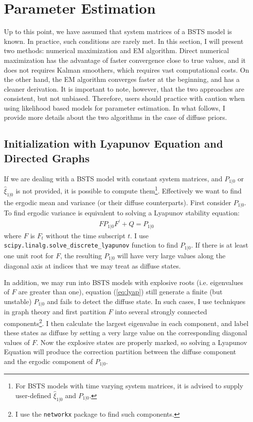 \documentclass[10pt, titlepage]{article}
\numberwithin{equation}{section}
\begin{document}
\section{Parameter Estimation} \label{sec:param}
Up to this point, we have assumed that system matrices of a BSTS model is known. In practice, such conditions are rarely met. In this section, I will present two methods: numerical maximization and EM algorithm. Direct numerical maximization has the advantage of faster convergence close to true values, and it does not requires Kalman smoothers, which requires vast computational costs. On the other hand, the EM algorithm converges faster at the beginning, and has a cleaner derivation. It is important to note, however, that the two approaches are consistent, but not unbiased. Therefore, users should practice with caution when using likelihood based models for parameter estimation. In what follows, I provide more details about the two algorithms in the case of diffuse priors.

\subsection{Initialization with Lyapunov Equation and Directed Graphs} 
If we are dealing with a BSTS model with constant system matrices, and $P_{1|0}$ or $\hat{\xi}_{1|0}$ is not provided, it is possible to compute them\footnote{For BSTS models with time varying system matrices, it is advised to supply user-defined $\hat{\xi}_{1|0}$ and $P_{1|0}$.}. Effectively we want to find the ergodic mean and variance (or their diffuse counterparts). First consider $P_{1|0}$. To find ergodic variance is equivalent to solving a Lyapunov stability equation:
\begin{align}
    FP_{1|0}F^{'} + Q = P_{1|0} \label{eq:lyap}
\end{align}
where $F$ is $F_t$ without the time subscript $t$. I use \texttt{scipy.linalg.solve\_discrete\_lyapunov} function to find $P_{1|0}$. If there is at least one unit root for $F$, the resulting $P_{1|0}$ will have very large values along the diagonal axis at indices that we may treat as diffuse states. 

In addition, we may run into BSTS models with explosive roots (i.e. eigenvalues of $F$ are greater than one), equation (\ref{eq:lyap}) still generate a finite (but unstable) $P_{1|0}$ and fails to detect the diffuse state. In such cases, I use techniques in graph theory and first partition $F$ into several strongly connected components\footnote{I use the \texttt{networkx} package to find such components.}. I then calculate the largest eigenvalue in each component, and label these states as diffuse by setting a very large value on the corresponding diagonal values of $F$. Now the explosive states are properly marked, so solving a Lyapunov Equation will produce the correction partition between the diffuse component and the ergodic component of $P_{1|0}$.
\end{document}
